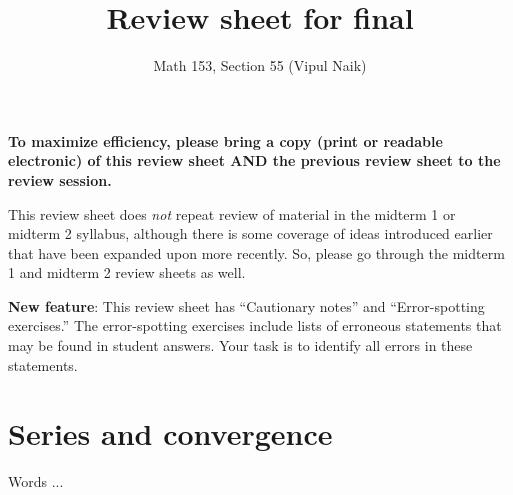 \documentclass[10pt]{amsart}
\title{Review sheet for final}
\author{Math 153, Section 55 (Vipul Naik)}
\begin{document}
\maketitle

{\bf To maximize efficiency, please bring a copy (print or readable
electronic) of this review sheet AND the previous review sheet to the
review session.}

This review sheet does {\em not} repeat review of material in the
midterm 1 or midterm 2 syllabus, although there is some coverage of
ideas introduced earlier that have been expanded upon more
recently. So, please go through the midterm 1 and midterm 2 review
sheets as well.

{\bf New feature}: This review sheet has ``Cautionary notes'' and
``Error-spotting exercises.'' The error-spotting exercises include
lists of erroneous statements that may be found in student
answers. Your task is to identify all errors in these statements.
\section{Series and convergence}

Words ...
\end{document}
